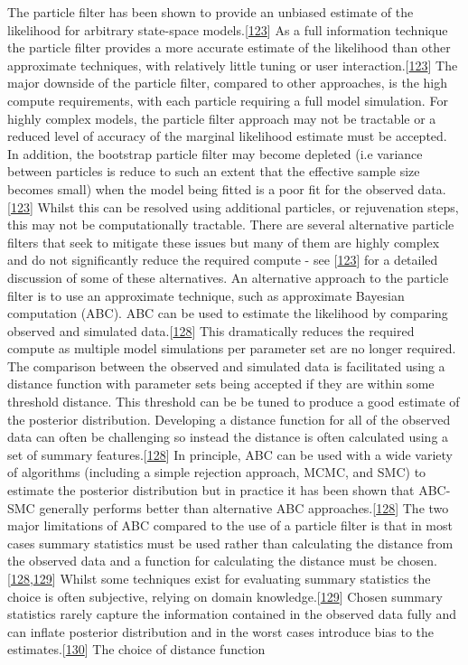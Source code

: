 \documentclass[11pt,twoside]{bristolthesis}
\begin{document}
  The particle filter has been shown to provide an unbiased estimate of the likelihood for arbitrary state-space models.{[}\protect\hyperlink{ref-Murray2015}{123}{]} As a full information technique the particle filter provides a more accurate estimate of the likelihood than other approximate techniques, with relatively little tuning or user interaction.{[}\protect\hyperlink{ref-Murray2015}{123}{]} The major downside of the particle filter, compared to other approaches, is the high compute requirements, with each particle requiring a full model simulation. For highly complex models, the particle filter approach may not be tractable or a reduced level of accuracy of the marginal likelihood estimate must be accepted. In addition, the bootstrap particle filter may become depleted (i.e variance between particles is reduce to such an extent that the effective sample size becomes small) when the model being fitted is a poor fit for the observed data.{[}\protect\hyperlink{ref-Murray2015}{123}{]} Whilst this can be resolved using additional particles, or rejuvenation steps, this may not be computationally tractable. There are several alternative particle filters that seek to mitigate these issues but many of them are highly complex and do not significantly reduce the required compute - see {[}\protect\hyperlink{ref-Murray2015}{123}{]} for a detailed discussion of some of these alternatives. An alternative approach to the particle filter is to use an approximate technique, such as approximate Bayesian computation (ABC). ABC can be used to estimate the likelihood by comparing observed and simulated data.{[}\protect\hyperlink{ref-Toni2009}{128}{]} This dramatically reduces the required compute as multiple model simulations per parameter set are no longer required. The comparison between the observed and simulated data is facilitated using a distance function with parameter sets being accepted if they are within some threshold distance. This threshold can be be tuned to produce a good estimate of the posterior distribution. Developing a distance function for all of the observed data can often be challenging so instead the distance is often calculated using a set of summary features.{[}\protect\hyperlink{ref-Toni2009}{128}{]} In principle, ABC can be used with a wide variety of algorithms (including a simple rejection approach, MCMC, and SMC) to estimate the posterior distribution but in practice it has been shown that ABC-SMC generally performs better than alternative ABC approaches.{[}\protect\hyperlink{ref-Toni2009}{128}{]} The two major limitations of ABC compared to the use of a particle filter is that in most cases summary statistics must be used rather than calculating the distance from the observed data and a function for calculating the distance must be chosen.{[}\protect\hyperlink{ref-Toni2009}{128},\protect\hyperlink{ref-Lintusaari2016}{129}{]} Whilst some techniques exist for evaluating summary statistics the choice is often subjective, relying on domain knowledge.{[}\protect\hyperlink{ref-Lintusaari2016}{129}{]} Chosen summary statistics rarely capture the information contained in the observed data fully and can inflate posterior distribution and in the worst cases introduce bias to the estimates.{[}\protect\hyperlink{ref-Busetto2013}{130}{]} The choice of distance function 
\end{document}
